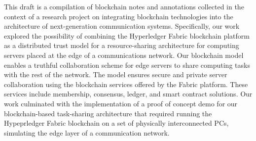 \documentclass[conference]{IEEEtran}
\begin{document}
This draft is a compilation of blockchain notes and annotations collected in the context of a research project on integrating blockchain technologies into the architecture of next-generation communication systems. Specifically, our work explored the possibility of combining the Hyperledger Fabric blockchain platform as a distributed trust model for a resource-sharing architecture for computing servers placed at the edge of a communications network. Our blockchain model enables a truthful collaboration scheme for edge servers to share computing tasks with the rest of the network. The model ensures secure and private server collaboration using the blockchain services offered by the Fabric platform. These services include membership, consensus, ledger, and smart contract solutions. Our work culminated with the implementation of a proof of concept demo for our blockchain-based task-sharing architecture that required running the Hypeprledger Fabric blockchain on a set of physically interconnected PCs, simulating the edge layer of a communication network. \\
\end{document}
